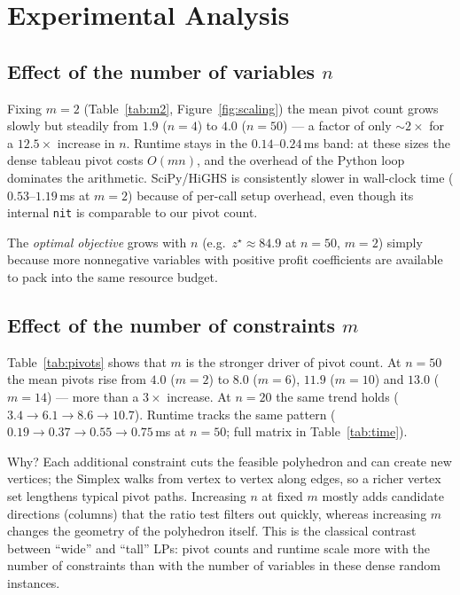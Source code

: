 \documentclass[10pt]{article}
\begin{document}
\section{Experimental Analysis}
\label{sec:analysis}

\subsection{Effect of the number of variables $n$}
Fixing $m=2$ (Table~\ref{tab:m2}, Figure~\ref{fig:scaling}) the mean pivot
count grows slowly but steadily from $1.9$ ($n=4$) to $4.0$ ($n=50$) --- a
factor of only $\sim\!2\times$ for a $12.5\times$ increase in $n$.  Runtime
stays in the $0.14$--$0.24$\,ms band: at these sizes the dense tableau
pivot costs $O(mn)$, and the overhead of the Python loop dominates the
arithmetic.  SciPy/HiGHS is consistently slower in wall-clock time
($0.53$--$1.19$\,ms at $m=2$) because of per-call setup overhead, even
though its internal \texttt{nit} is comparable to our pivot count.

The \emph{optimal objective} grows with $n$ (e.g.\ $z^\star\approx 84.9$ at
$n=50$, $m=2$) simply because more nonnegative variables with positive
profit coefficients are available to pack into the same resource budget.

\subsection{Effect of the number of constraints $m$}
Table~\ref{tab:pivots} shows that $m$ is the stronger driver of pivot count.
At $n=50$ the mean pivots rise from $4.0$ ($m=2$) to $8.0$ ($m=6$),
$11.9$ ($m=10$) and $13.0$ ($m=14$) --- more than a $3\times$ increase.
At $n=20$ the same trend holds ($3.4 \to 6.1 \to 8.6 \to 10.7$).  Runtime
tracks the same pattern ($0.19 \to 0.37 \to 0.55 \to 0.75$\,ms at $n=50$;
full matrix in Table~\ref{tab:time}).

Why?  Each additional constraint cuts the feasible polyhedron and can
create new vertices; the Simplex walks from vertex to vertex along edges,
so a richer vertex set lengthens typical pivot paths.  Increasing $n$ at
fixed $m$ mostly adds candidate directions (columns) that the ratio test
filters out quickly, whereas increasing $m$ changes the geometry of the
polyhedron itself.  This is the classical contrast between ``wide'' and
``tall'' LPs: pivot counts and runtime scale more with the number of
constraints than with the number of variables in these dense random
instances.
\end{document}
